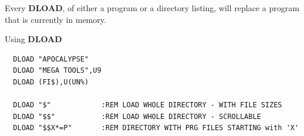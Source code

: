 \begin{description}[leftmargin=2cm,style=nextline]
   Every {\bf DLOAD}, of either a program or a directory listing, will replace
   a program that is currently in memory.

\item [Examples:] Using {\bf DLOAD}
\begin{tcolorbox}[colback=black,coltext=white]
\verbatimfont{\codefont}
\begin{verbatim}
  DLOAD "APOCALYPSE"
  DLOAD "MEGA TOOLS",U9
  DLOAD (FI$),U(UN%)

  DLOAD "$"            :REM LOAD WHOLE DIRECTORY - WITH FILE SIZES
  DLOAD "$$"           :REM LOAD WHOLE DIRECTORY - SCROLLABLE
  DLOAD "$$X*=P"       :REM DIRECTORY WITH PRG FILES STARTING with 'X'
\end{verbatim}
\end{tcolorbox}
\end{description}


\newpage
